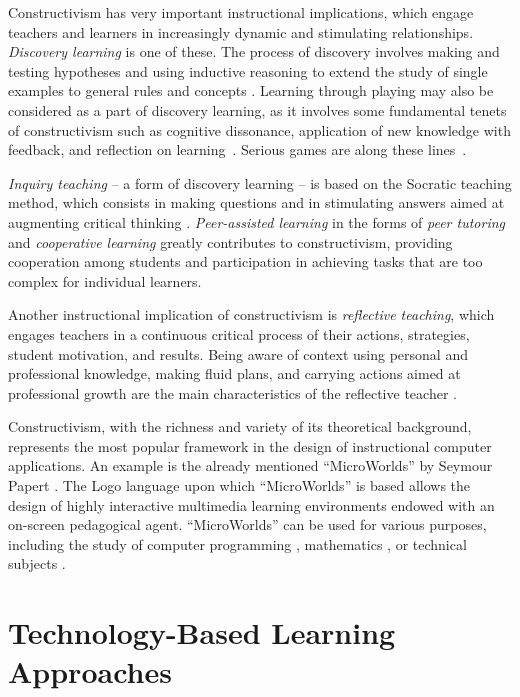 \documentclass[journal]{IEEEtran}
\begin{document}
Constructivism has very important instructional implications, which engage teachers and learners in increasingly dynamic and stimulating relationships. \textit{Discovery learning} is one of these. The process of discovery involves making and testing hypotheses and using inductive reasoning to extend the study of single examples to general rules and concepts \cite{bruner1961act}. Learning through playing may also be considered as a part of discovery learning, as it involves some fundamental tenets of constructivism such as cognitive dissonance, application of new knowledge with feedback, and reflection on learning~\cite{baviskar2009essential}. Serious games are along these lines~\cite{barate2013serious}.

\textit{Inquiry teaching} -- a form of discovery learning -- is based on the Socratic teaching method, which consists in making questions and in stimulating answers aimed at augmenting critical thinking \cite{stevens2013cognitive}. \textit{Peer-assisted learning} in the forms of \textit{peer tutoring} and \textit{cooperative learning} greatly contributes to constructivism, providing cooperation among students and participation in achieving tasks that are too complex for individual learners. 

Another instructional implication of constructivism is \textit{reflective teaching}, which engages teachers in a continuous critical process of their actions, strategies, student motivation, and results. Being aware of context using personal and professional knowledge, making fluid plans, and carrying actions aimed at professional growth are the main characteristics of the reflective teacher \cite{savage2006teaching}. 

Constructivism, with the richness and variety of its theoretical background, represents the most popular framework in the design of instructional computer applications. An example is the already mentioned ``MicroWorlds'' by Seymour Papert \cite{papert1999logo}. The Logo language upon which ``MicroWorlds'' is based allows the design of highly interactive multimedia learning environments endowed with an on-screen pedagogical agent. ``MicroWorlds'' can be used for various purposes, including the study of computer programming \cite{mcnerney2004turtles}, mathematics \cite{hoyles1992pedagogy}, or technical subjects \cite{mayer2003multimedia}. 



\section{Technology-Based Learning Approaches}
\label{sec:lrnappr}
\end{document}

